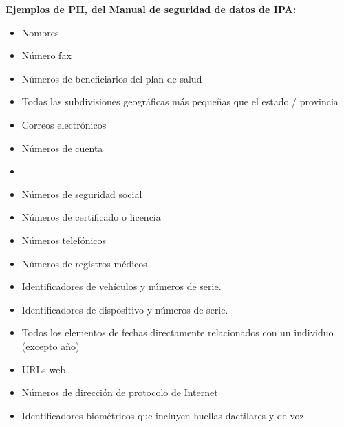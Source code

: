 \documentclass[11pt,en]{elegantpaper}
\begin{document}
\noindent
\textbf{Ejemplos de PII, del Manual de seguridad de datos de IPA:}

\begin{multicols}{3}

\begin{itemize}
	\item Nombres
	
	\item Número fax
	
	\item Números de beneficiarios del plan de salud
	
	\item Todas las subdivisiones geográficas más pequeñas que el estado / provincia
	
	\item Correos electrónicos
	
	\item Números de cuenta
	
	\item[\vspace{\fill}]
	
	\item Números de seguridad social
	
	\item Números de certificado o licencia
	
	\item Números telefónicos
	
	\item Números de registros médicos
	
	\item Identificadores de vehículos y números de serie.
	
	\item Identificadores de dispositivo y números de serie.

	\item Todos los elementos de fechas directamente relacionados con un individuo (excepto año)
		
	\item URLs web
	
	\item Números de dirección de protocolo de Internet
	
	\item Identificadores biométricos que incluyen huellas dactilares y de voz 
	
\end{itemize}

\end{multicols}
\end{document}
